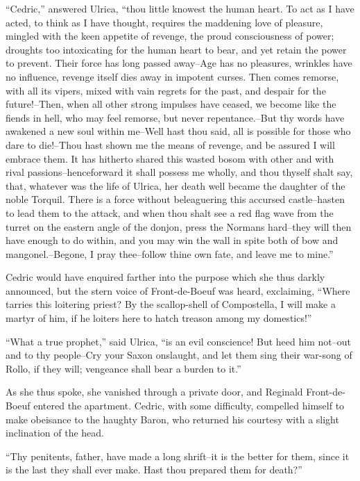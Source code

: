 ``Cedric,'' answered Ulrica, ``thou little knowest the human heart. To
act as I have acted, to think as I have thought, requires the maddening
love of pleasure, mingled with the keen appetite of revenge, the proud
consciousness of power; droughts too intoxicating for the human heart to
bear, and yet retain the power to prevent. Their force has long passed
away--Age has no pleasures, wrinkles have no influence, revenge itself
dies away in impotent curses. Then comes remorse, with all its vipers,
mixed with vain regrets for the past, and despair for the future!--Then,
when all other strong impulses have ceased, we become like the fiends in
hell, who may feel remorse, but never repentance.--But thy words have
awakened a new soul within me--Well hast thou said, all is possible for
those who dare to die!--Thou hast shown me the means of revenge, and be
assured I will embrace them. It has hitherto shared this wasted bosom
with other and with rival passions--henceforward it shall possess me
wholly, and thou thyself shalt say, that, whatever was the life of
Ulrica, her death well became the daughter of the noble Torquil. There
is a force without beleaguering this accursed castle--hasten to lead
them to the attack, and when thou shalt see a red flag wave from the
turret on the eastern angle of the donjon, press the Normans hard--they
will then have enough to do within, and you may win the wall in spite
both of bow and mangonel.--Begone, I pray thee--follow thine own fate,
and leave me to mine.''

Cedric would have enquired farther into the purpose which she thus
darkly announced, but the stern voice of Front-de-Boeuf was heard,
exclaiming, ``Where tarries this loitering priest? By the scallop-shell
of Compostella, I will make a martyr of him, if he loiters here to hatch
treason among my domestics!''

``What a true prophet,'' said Ulrica, ``is an evil conscience! But heed
him not--out and to thy people--Cry your Saxon onslaught, and let them
sing their war-song of Rollo, if they will; vengeance shall bear a
burden to it.''

As she thus spoke, she vanished through a private door, and Reginald
Front-de-Boeuf entered the apartment. Cedric, with some difficulty,
compelled himself to make obeisance to the haughty Baron, who returned
his courtesy with a slight inclination of the head.

``Thy penitents, father, have made a long shrift--it is the better for
them, since it is the last they shall ever make. Hast thou prepared them
for death?''

